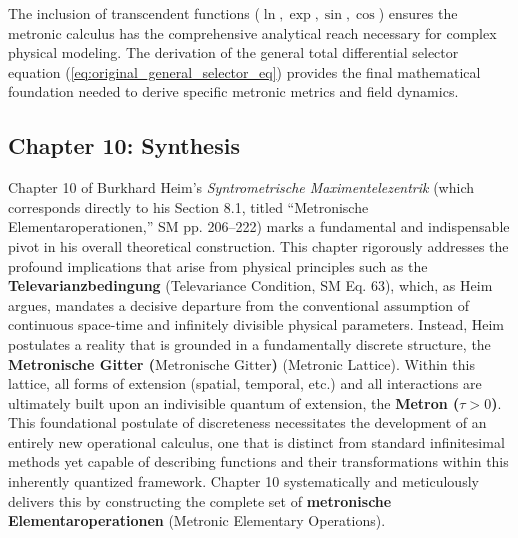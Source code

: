 \documentclass[12pt]{article}
\newcommand{\q}[1]{\enquote{#1}}
\newcommand{\metron}{\tau}
\newcommand{\metronischegitter}{\text{Metronische Gitter}}
\begin{document}
The inclusion of transcendent functions (\(\ln, \exp, \sin, \cos\)) ensures the metronic calculus has the comprehensive analytical reach necessary for complex physical modeling. The derivation of the general total differential selector equation (\eqref{eq:original_general_selector_eq}) provides the final mathematical foundation needed to derive specific metronic metrics and field dynamics. 
\subsection{Chapter 10: Synthesis}
\label{sec:chapter10_synthesis}

Chapter 10 of Burkhard Heim's \textit{Syntrometrische Maximentelezentrik} (which corresponds directly to his Section 8.1, titled \q{Metronische Elementaroperationen,} SM pp. 206–222) marks a fundamental and indispensable pivot in his overall theoretical construction. This chapter rigorously addresses the profound implications that arise from physical principles such as the \textbf{Televarianzbedingung} (Televariance Condition, SM Eq. 63), which, as Heim argues, mandates a decisive departure from the conventional assumption of continuous space-time and infinitely divisible physical parameters. Instead, Heim postulates a reality that is grounded in a fundamentally discrete structure, the \textbf{Metronische Gitter (\(\metronischegitter\))} (Metronic Lattice). Within this lattice, all forms of extension (spatial, temporal, etc.) and all interactions are ultimately built upon an indivisible quantum of extension, the \textbf{Metron (\( \metron > 0 \))}. This foundational postulate of discreteness necessitates the development of an entirely new operational calculus, one that is distinct from standard infinitesimal methods yet capable of describing functions and their transformations within this inherently quantized framework. Chapter 10 systematically and meticulously delivers this by constructing the complete set of \textbf{metronische Elementaroperationen} (Metronic Elementary Operations).
\end{document}
